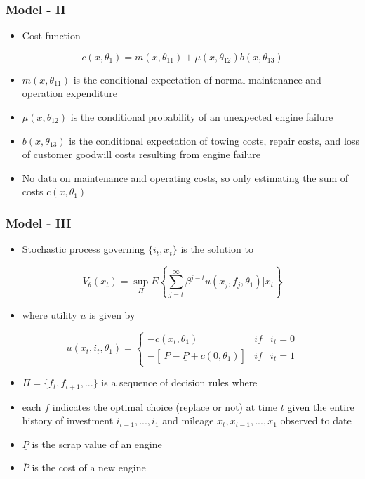 \documentclass{beamer}
\begin{document}
\begin{frame}
\frametitle{Model - II}
\begin{itemize}
\item Cost function 
\end{itemize}
\[ c(x,\theta_1)=m(x,\theta_{11}) +\mu(x,\theta_{12})b(x,\theta_{13})\]
\begin{itemize}
\item $m(x,\theta_{11})$ is the conditional expectation of normal maintenance and operation expenditure
\bigskip
\item $\mu(x,\theta_{12})$ is the conditional probability of an unexpected engine failure
\bigskip
\item $b(x,\theta_{13})$ is the conditional expectation of towing costs, repair costs, and loss of customer goodwill costs resulting from engine failure
\bigskip
\item No data on maintenance and operating costs, so only estimating the sum of costs $c(x,\theta_1)$ 
\end{itemize}
\end{frame}



\begin{frame}
\frametitle{Model - III}
\begin{itemize}
\item Stochastic process governing $\{i_t,x_t\}$ is the solution to 
\end{itemize}
\[ V_\theta(x_t) = \sup_{\Pi} E\left\{\sum_{j=t}^\infty \beta^{j-t}u(x_j,f_j,\theta_1)\left| x_t\right.\right\}\]
\begin{itemize}
\item where utility $u$ is given by 
\end{itemize}
\[ u(x_t,i_t,\theta_1) = \left\{ \begin{array}{ccc} -c(x_t,\theta_1) & if &i_t=0\\
-\left[ \ \overline{P} - \underline{P} + c(0,\theta_1)\right]& if & i_t = 1\end{array}\right.  \]
\begin{itemize}
\item $\Pi=\{f_t,f_{t+1},{...}\}$ is a sequence of decision rules where 
\bigskip
\item each $f$ indicates the optimal choice (replace or not) at time $t$ given the entire history of investment $i_{t-1},...,i_1$ and mileage $x_t,x_{t-1},...,x_1$ observed to date
\bigskip
\item $\underline{P}$ is the scrap value of an engine
\bigskip
\item $\overline{P}$ is the cost of a new engine
\end{itemize}
\end{frame}
\end{document}
